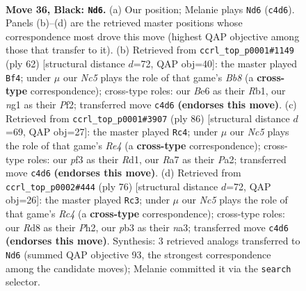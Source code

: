\documentclass[11pt]{article}
\begin{document}
\clearpage

\begin{figure}[p]\centering
\begin{subfigure}{0.46\textwidth}\centering
\resizebox{\linewidth}{!}{%
\newchessgame
\chessboard[
  setfen={3r4/r7/p1B1bk2/p4ppp/2n5/PP3PP1/7P/RKB2RN1 b - - 0 36},
  showmover=false,
  pgfstyle=straightmove, color=movearrow, markmove={c4-d6}
]}
\caption{}
\end{subfigure}\hfill
\begin{subfigure}{0.46\textwidth}\centering
\resizebox{\linewidth}{!}{%
\newchessgame
\chessboard[
  setfen={rBb2r2/p3p2k/5b1p/P1NR1p2/6p1/4P3/5PPP/1R4K1 w - - 7 32},
  showmover=false,
  pgfstyle=straightmove, color=movearrow, markmove={b8-f4}
]}
\caption{}
\end{subfigure}
\\[4pt]
\begin{subfigure}{0.46\textwidth}\centering
\resizebox{\linewidth}{!}{%
\newchessgame
\chessboard[
  setfen={r5k1/5rp1/p1b2p1p/b1P1p2P/4RPPN/2P1B1K1/P7/3R4 w - - 3 44},
  showmover=false,
  pgfstyle=straightmove, color=movearrow, markmove={e4-c4}
]}
\caption{}
\end{subfigure}\hfill
\begin{subfigure}{0.46\textwidth}\centering
\resizebox{\linewidth}{!}{%
\newchessgame
\chessboard[
  setfen={5b2/6kp/p1N1rpp1/8/NPR1pPb1/n3B1P1/4PK1P/8 w - - 19 39},
  showmover=false,
  pgfstyle=straightmove, color=movearrow, markmove={c4-c3}
]}
\caption{}
\end{subfigure}
\caption{\textbf{Move 36, Black: \texttt{Nd6}.} (a) Our position; Melanie plays \texttt{Nd6} (\texttt{c4d6}). Panels (b)--(d) are the retrieved master positions whose correspondence most drove this move (highest QAP objective among those that transfer to it). (b) Retrieved from \texttt{ccrl\_top\_p0001\#1149} (ply 62) [structural distance $d$=72, QAP obj=40]: the master played \texttt{Bf4}; under $\mu$ our \emph{Nc5} plays the role of that game's \emph{Bb8} (a \textbf{cross-type} correspondence); cross-type roles: our \emph{B}e6 as their \emph{R}b1, our \emph{n}g1 as their \emph{P}f2; transferred move \texttt{c4d6} \textbf{(endorses this move)}. (c) Retrieved from \texttt{ccrl\_top\_p0001\#3907} (ply 86) [structural distance $d$=69, QAP obj=27]: the master played \texttt{Rc4}; under $\mu$ our \emph{Nc5} plays the role of that game's \emph{Re4} (a \textbf{cross-type} correspondence); cross-type roles: our \emph{p}f3 as their \emph{R}d1, our \emph{R}a7 as their \emph{P}a2; transferred move \texttt{c4d6} \textbf{(endorses this move)}. (d) Retrieved from \texttt{ccrl\_top\_p0002\#444} (ply 76) [structural distance $d$=72, QAP obj=26]: the master played \texttt{Rc3}; under $\mu$ our \emph{Nc5} plays the role of that game's \emph{Rc4} (a \textbf{cross-type} correspondence); cross-type roles: our \emph{R}d8 as their \emph{P}h2, our \emph{p}b3 as their \emph{n}a3; transferred move \texttt{c4d6} \textbf{(endorses this move)}. Synthesis: 3 retrieved analogs transferred to \texttt{Nd6} (summed QAP objective 93, the strongest correspondence among the candidate moves); Melanie committed it via the \texttt{search} selector.}
\label{fig:thought-m71}
\end{figure}
\end{document}
